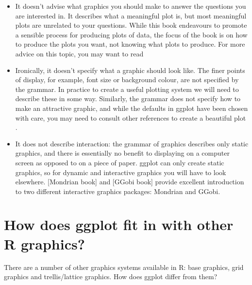 \begin{itemize}
	\item It doesn't advise what graphics you should make to answer the questions you are interested in.  It describes what a meaningful plot is, but most meaningful plots are unrelated to your questions. While this book endeavours to promote a sensible process for producing plots of data, the focus of the book is on how to produce the plots you want, not knowing what plots to produce. For more advice on this topic, you may want to read \citep{robbins:2004,cleveland:1993,chambers:1983,tukey:1977}

	\item Ironically, it doesn't specify what a graphic should look like.  The finer points of display, for example, font size or background colour, are not specified by the grammar.  In practice to create a useful plotting system we will need to describe these in some way. Similarly, the grammar does not specify how to make an attractive graphic, and while the defaults in ggplot have been chosen with care, you may need to consult other references to create a beautiful plot \citep{tufte:1990,tufte:1997,tufte:2001,tufte:2006}.

	\item It does not describe interaction: the grammar of graphics describes only static graphics, and there is essentially no benefit to displaying on a computer screen as opposed to on a piece of paper.  ggplot can only create static graphics, so for dynamic and interactive graphics you will have to look elsewhere.  [Mondrian book] and [GGobi book] provide excellent introduction to two different interactive graphics packages: Mondrian and GGobi.

\end{itemize}

\section{How does ggplot fit in with other R graphics?}

There are a number of other graphics systems available in R: base graphics, grid graphics and trellis/lattice graphics.  How does ggplot differ from them?

